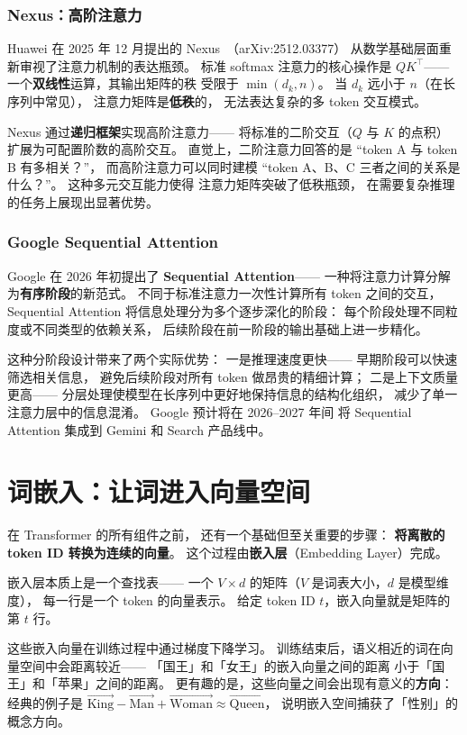 \subsubsection{Nexus：高阶注意力}

Huawei 在 2025 年 12 月提出的
Nexus~\cite{nexus2025}（arXiv:2512.03377）
从数学基础层面重新审视了注意力机制的表达瓶颈。
标准 softmax 注意力的核心操作是 $QK^\top$——
一个\textbf{双线性}运算，其输出矩阵的秩
受限于 $\min(d_k, n)$。
当 $d_k$ 远小于 $n$（在长序列中常见），
注意力矩阵是\textbf{低秩}的，
无法表达复杂的多 token 交互模式。

Nexus 通过\textbf{递归框架}实现高阶注意力——
将标准的二阶交互（$Q$ 与 $K$ 的点积）
扩展为可配置阶数的高阶交互。
直觉上，二阶注意力回答的是
``token A 与 token B 有多相关？''，
而高阶注意力可以同时建模
``token A、B、C 三者之间的关系是什么？''。
这种多元交互能力使得
注意力矩阵突破了低秩瓶颈，
在需要复杂推理的任务上展现出显著优势。

\subsubsection{Google Sequential Attention}

Google 在 2026 年初提出了 \textbf{Sequential Attention}——
一种将注意力计算分解为\textbf{有序阶段}的新范式。
不同于标准注意力一次性计算所有 token 之间的交互，
Sequential Attention 将信息处理分为多个逐步深化的阶段：
每个阶段处理不同粒度或不同类型的依赖关系，
后续阶段在前一阶段的输出基础上进一步精化。

这种分阶段设计带来了两个实际优势：
一是推理速度更快——
早期阶段可以快速筛选相关信息，
避免后续阶段对所有 token 做昂贵的精细计算；
二是上下文质量更高——
分层处理使模型在长序列中更好地保持信息的结构化组织，
减少了单一注意力层中的信息混淆。
Google 预计将在 2026--2027 年间
将 Sequential Attention 集成到 Gemini 和 Search 产品线中。

\section{词嵌入：让词进入向量空间}

在 Transformer 的所有组件之前，
还有一个基础但至关重要的步骤：
\textbf{将离散的 token ID 转换为连续的向量}。
这个过程由\textbf{嵌入层}（Embedding Layer）完成。

嵌入层本质上是一个查找表——
一个 $V \times d$ 的矩阵（$V$ 是词表大小，$d$ 是模型维度），
每一行是一个 token 的向量表示。
给定 token ID $t$，嵌入向量就是矩阵的第 $t$ 行。

这些嵌入向量在训练过程中通过梯度下降学习。
训练结束后，语义相近的词在向量空间中会距离较近——
「国王」和「女王」的嵌入向量之间的距离
小于「国王」和「苹果」之间的距离。
更有趣的是，这些向量之间会出现有意义的\textbf{方向}：
经典的例子是 $\vec{\text{King}} - \vec{\text{Man}} + \vec{\text{Woman}} \approx \vec{\text{Queen}}$，
说明嵌入空间捕获了「性别」的概念方向。


